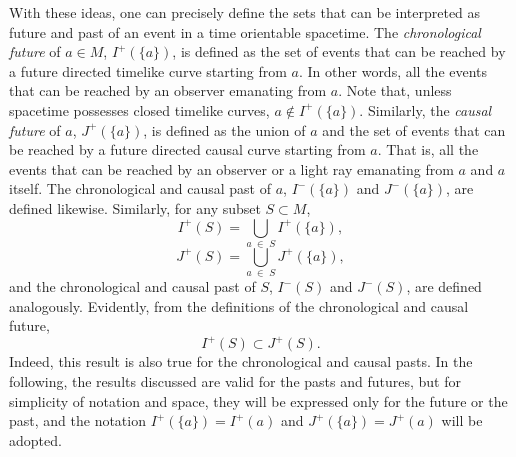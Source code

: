\documentclass[
12pt,		%
openright,	%
twoside,  %
a4paper,			%
chapter=TITLE,		%
english,			%
french,				%
spanish,			%
brazil				%
]{USPSC-classe/USPSC}
\begin{document}
With these ideas, one can precisely define the sets that can be interpreted as future and past of an event in a time orientable spacetime. The \textit{chronological future} of $a\in M$, $I^+(\{a\})$, is defined as the set of events that can be reached by a future directed timelike curve starting from $a$. In other words, all the events that can be reached by an observer emanating from $a$. Note that, unless spacetime possesses closed timelike curves, $a\not\in I^+(\{a\})$. Similarly, the \textit{causal future} of $a$, $J^+(\{a\})$, is defined as the union of $a$ and the set of events that can be reached by a future directed causal curve starting from $a$. That is, all the events that can be reached by an observer or a light ray emanating from $a$ and $a$ itself. The chronological and causal past of $a$, $I^-(\{a\})$ and $J^-(\{a\})$, are defined likewise. Similarly, for any subset $S\subset M$, 
\begin{equation}\label{chrono}
    I^+(S)=\bigcup_{a\;\in\;S}I^+(\{a\}),
\end{equation}
\begin{equation}
    J^+(S)=\bigcup_{a\;\in\;S}J^+(\{a\}),
\end{equation}
and the chronological and causal past of $S$, $I^-(S)$ and $J^-(S)$, are defined analogously. Evidently, from the definitions of the chronological and causal future,
\begin{equation}\label{future1}
    I^+(S)\subset J^+(S).
\end{equation}
Indeed, this result is also true for the chronological and causal pasts. In the following, the results discussed are valid for the pasts and futures, but for simplicity of notation and space, they will be expressed only for the future or the past, and the notation $I^+(\{a\})=I^+(a)$ and $J^+(\{a\})=J^+(a)$ will be adopted.
\end{document}
